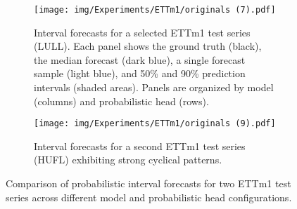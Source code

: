 \documentclass[a4paper,oneside,bibliography=totoc]{scrbook}
\begin{document}



\begin{figure}[htbp]
\centering
\begin{subfigure}[t]{0.45\textwidth}
    \centering
    \texttt{[image: img/Experiments/ETTm1/originals (7).pdf]}
    \caption{Interval forecasts for a selected ETTm1 test series (LULL). Each panel shows the ground truth (black), the median forecast (dark blue), a single forecast sample (light blue), and 50\% and 90\% prediction intervals (shaded areas). Panels are organized by model (columns) and probabilistic head (rows).}
    \label{fig:ETTm1_intervals}
\end{subfigure}
\hfill
\begin{subfigure}[t]{0.45\textwidth}
    \centering
    \texttt{[image: img/Experiments/ETTm1/originals (9).pdf]}
    \caption{Interval forecasts for a second ETTm1 test series (HUFL) exhibiting strong cyclical patterns.}
    \label{fig:ETTm1_intervals_2}
\end{subfigure}
\caption{Comparison of probabilistic interval forecasts for two ETTm1 test series across different model and probabilistic head configurations.}
\label{fig:ETTm1_intervals_3}
\end{figure}
\end{document}
